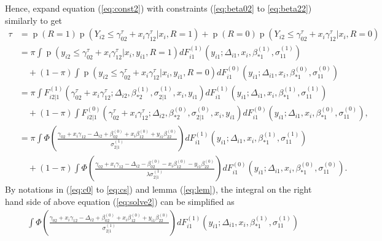 \documentclass[12pt]{article}
\DeclareMathOperator{\pr}{p}
\begin{document}
\begin{itemize}
  Hence, expand equation (\ref{eq:const2}) with constraints
  (\ref{eq:beta02} to \ref{eq:beta22}) similarly to get
  \begin{align}
    \tau & = \pr (R = 1) \pr (Y_{i2} \leq \gamma^{\tau}_{02} + x_i
    \gamma^{\tau}_{12} | x_i , R = 1) + \pr (R = 0) \pr (Y_{i2} \leq
    \gamma^{\tau}_{02} + x_i
    \gamma^{\tau}_{12} | x_i , R = 0)  \nonumber\\
    & = \pi \int \pr (y_{i2} \leq \gamma^{\tau}_{02} + x_i \gamma^{\tau}_{12} | x_i , y_{i1}, R = 1) dF_{i1}^{(1)}(y_{i1}; \Delta_{i1}, x_i, \beta_{*1}^{(1)}, \sigma_{11}^{(1)})  \nonumber\\
    & \quad + (1-\pi) \int \pr (y_{i2} \leq \gamma^{\tau}_{02} + x_i \gamma^{\tau}_{12} | x_i , y_{i1}, R = 0) dF_{i1}^{(0)}(y_{i1}; \Delta_{i1}, x_i, \beta_{*1}^{(0)}, \sigma_{11}^{(0)}) \nonumber \\
    & = \pi \int F_{i2|1}^{(1)} (\gamma^{\tau}_{02} + x_i \gamma^{\tau}_{12} ; \Delta_{i2}, \beta_{*2}^{(1)}, \sigma_{2|1}^{(1)}, x_i , y_{i1}) dF_{i1}^{(1)}(y_{i1}; \Delta_{i1}, x_i, \beta_{*1}^{(1)}, \sigma_{11}^{(1)})  \nonumber\\
    & \quad + (1-\pi) \int F_{i2|1}^{(0)} (\gamma^{\tau}_{02} + x_i \gamma^{\tau}_{12} ; \Delta_{i2},\beta_{*2}^{(0)}, \sigma_{2|1}^{(0)},  x_i , y_{i1}) dF_{i1}^{(0)}(y_{i1}; \Delta_{i1}, x_i, \beta_{*1}^{(0)}, \sigma_{11}^{(0)}), \nonumber\\
    & = \pi \int \Phi \left( \frac{\gamma_{02} + x_i\gamma_{12} - \Delta_{i2} + \beta_{02}^{(0)} + x_i\beta_{12}^{(0)} + y_{i1}\beta_{22}^{(0)}}{\sigma_{2|1}^{(1)}} \right) dF_{i1}^{(1)}(y_{i1}; \Delta_{i1}, x_i, \beta_{*1}^{(1)}, \sigma_{11}^{(1)}) \nonumber\\
    \label{eq:solve2}
    & \quad + (1-\pi) \int \Phi \left( \frac{\gamma_{02} +
        x_i\gamma_{12} - \Delta_{i2} - \beta_{02}^{(0)} -
        x_i\beta_{12}^{(0)} -
        y_{i1}\beta_{22}^{(0)}}{\lambda\sigma_{2|1}^{(1)}} \right)
    dF_{i1}^{(0)}(y_{i1}; \Delta_{i1}, x_i, \beta_{*1}^{(0)},
    \sigma_{11}^{(0)}).
  \end{align}
  By notations in (\ref{eq:c0} to \ref{eq:cs}) and lemma
  (\ref{eq:lem}), the integral on the right hand side of above
  equation (\ref{eq:solve2}) can be simplified as
  \begin{align*}
    &    \int \Phi \left( \frac{\gamma_{02} + x_i\gamma_{12} - \Delta_{i2} + \beta_{02}^{(0)} + x_i\beta_{12}^{(0)} + y_{i1}\beta_{22}^{(0)}}{\sigma_{2|1}^{(1)}} \right) dF_{i1}^{(1)}(y_{i1}; \Delta_{i1}, x_i, \beta_{*1}^{(1)}, \sigma_{11}^{(1)}) \\

\end{align*}
\end{itemize}
\end{document}
